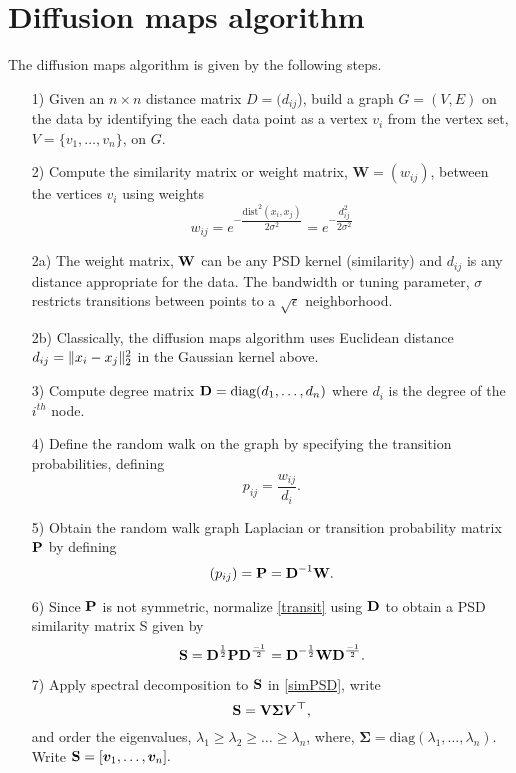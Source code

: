 \section{Diffusion maps algorithm}\label{diffusion maps}
The diffusion maps algorithm is given by the following steps.
\begin{itemize}
\item[1)] Given an $n \times n$ distance matrix $D = (d_{ij}$), build a graph $G = (V,E)$ on the data by identifying the each data point
as a vertex $v_{i}$ from the vertex set, $V = \{v_{1}, \ldots, v_{n}\}$, on  $G$.
\item[2)] Compute the similarity matrix or weight matrix, $\bm{W} = (w_{ij})$, between the vertices $v_{i}$ using weights
\[
w_{ij} = e^{-\dfrac{\text{dist}^{2}(x_{i}, x_{j})}{2\sigma^2}} 
= e^{-\dfrac{d_{ij}^{2}}{2\sigma^2}}
\] 
\item[2a)] The weight matrix, $\textbf{W}$ can be any PSD kernel (similarity) and $d_{ij}$ is any distance appropriate for the data. The bandwidth or tuning parameter, $\sigma$ restricts transitions between points to a $\sqrt{\epsilon}$ neighborhood.
\item[2b)] Classically, the diffusion maps algorithm uses Euclidean distance 
$d_{ij} = \lVert x_{i} - x_{j}\rVert^{2}_{2}$ in the Gaussian kernel above.
\item[3)] Compute degree matrix $\textbf{D} = \text{diag}(d_{1}, \ldots, d_{n})$
where $d_{i}$ is the degree of the $i^{th}$ node.
\item[4)] Define the random walk on the graph by specifying the transition probabilities, defining 
\[
p_{ij} = \frac{w_{ij}}{d_{i}}.
\]
\item[5)] Obtain the random walk graph Laplacian or transition probability
matrix $\textbf{P}$ by defining 
\begin{equation}\label{transit} 
(p_{ij}) = \textbf{P} = \textbf{D}^{-1}\textbf{W}.
\end{equation}

\item[6)] Since $\textbf{P}$ is not symmetric, normalize \eqref{transit}
using $\textbf{D}$ to obtain a PSD similarity matrix S given by
\begin{equation}\label{simPSD}
\textbf{S} = \textbf{D}^{\frac{1}{2}}\textbf{P}\textbf{D}^{\frac{-1}{2}} = \textbf{D}^{-\frac{1}{2}}\textbf{W}\textbf{D}^{\frac{-1}{2}}. 
\end{equation} 

\item[7)] Apply spectral decomposition to $\textbf{S}$ in \eqref{simPSD}, write
\begin{equation}
\textbf{S} = \textbf{V}\bm{\Sigma}\bm{V^{\top}},
\end{equation}
and order the eigenvalues, $\lambda_{1}\geq \lambda_{2} \geq \ldots \geq \lambda_{n}$, where,  
$\bm{\Sigma} = \text{diag}(\lambda_{1}, \ldots, \lambda_{n})$. Write 
$\textbf{S} = [\boldsymbol{v}_{1}, \ldots, \boldsymbol{v}_{n}].$


\end{itemize}
